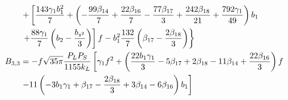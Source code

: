 \begin{align}
&\left. + \left[ \frac{143 \gamma_1 b_{1}^{2}}{7}+ \left( -\frac{99 \beta_{14}}{7}+\frac{22 \beta_{16}}{7}-\frac{77 \beta_{17}}{3}+\frac{242 \beta_{18}}{21}+\frac{792 \gamma_1}{49}\right) b_{1} \right. \right. \nonumber \\
&\left. \left. + \frac{88 \gamma_1}{7} \left( b_{2}-\frac{b_{s^2}}{3}\right) \right] f - b_1^2 \frac{132}{7} \left(\beta_{17}-\frac{2 \beta_{18}}{3}\right)  \right\}\\
%
%
B_{3,3} &=-f \sqrt{35 \pi}\frac{P_L P_S}{1155 k_{L}} \left[\gamma_1 f^{2}+\left(\frac{22 b_{1} \gamma_1}{3}-5 \beta_{17}+2 \beta_{18}-11 \beta_{14}+\frac{22 \beta_{16}}{3}\right) f \right. \nonumber \\
&\left. - 11\left(-3 b_{1} \gamma_1+\beta_{17}-\frac{2 \beta_{18}}{3} \vphantom{\frac{b_{s^2}}{3}}+3 \beta_{14}-6 \beta_{16}\right) b_{1}\right]  
%
\end{align}